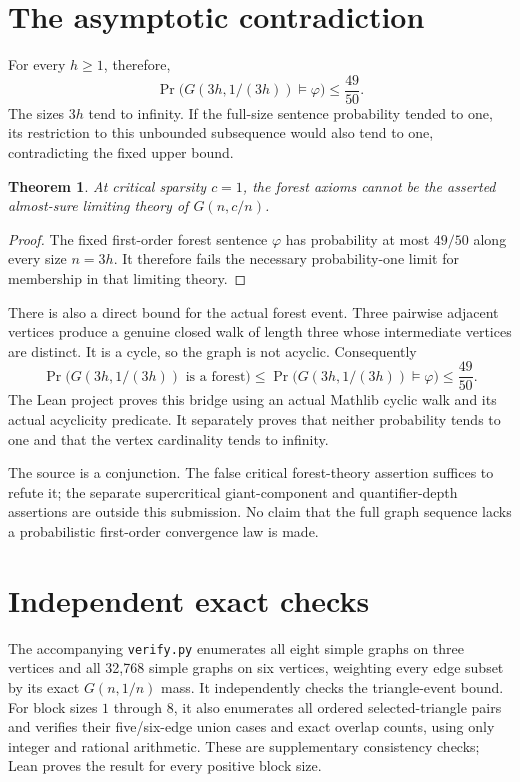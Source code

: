 \documentclass[11pt]{article}
\newtheorem{theorem}{Theorem}
\begin{document}
\newpage
\section*{The asymptotic contradiction}
For every $h\geq1$, therefore,
\[
 \Pr\bigl(G(3h,1/(3h))\models\varphi\bigr)
                    \leq\frac{49}{50}.
\]
The sizes $3h$ tend to infinity. If the full-size
sentence probability tended to one, its restriction
to this unbounded subsequence would also tend to one,
contradicting the fixed upper bound.

\begin{theorem}
At critical sparsity $c=1$, the forest axioms cannot
be the asserted almost-sure limiting theory of
$G(n,c/n)$.
\end{theorem}
\begin{proof}
The fixed first-order forest sentence $\varphi$ has
probability at most $49/50$ along every size $n=3h$.
It therefore fails the necessary probability-one
limit for membership in that limiting theory.
\end{proof}

There is also a direct bound for the actual forest
event. Three pairwise adjacent vertices produce a
genuine closed walk of length three whose intermediate
vertices are distinct. It is a cycle, so the graph
is not acyclic. Consequently
\[
 \Pr\bigl(G(3h,1/(3h))\text{ is a forest}\bigr)
       \leq\Pr\bigl(G(3h,1/(3h))\models\varphi\bigr)
       \leq\frac{49}{50}.
\]
The Lean project proves this bridge using an actual
Mathlib cyclic walk and its actual acyclicity predicate.
It separately proves that neither probability tends
to one and that the vertex cardinality tends to infinity.

The source is a conjunction. The false critical
forest-theory assertion suffices to refute it;
the separate supercritical giant-component and
quantifier-depth assertions are outside this submission.
No claim that the full graph sequence lacks a
probabilistic first-order convergence law is made.

\section*{Independent exact checks}
The accompanying \texttt{verify.py} enumerates all
eight simple graphs on three vertices and all
32,768 simple graphs on six vertices, weighting
every edge subset by its exact $G(n,1/n)$ mass.
It independently checks the triangle-event bound.
For block sizes $1$ through $8$, it also enumerates
all ordered selected-triangle pairs and verifies
their five/six-edge union cases and exact overlap
counts, using only integer and rational arithmetic.
These are supplementary consistency checks; Lean
proves the result for every positive block size.
\end{document}
